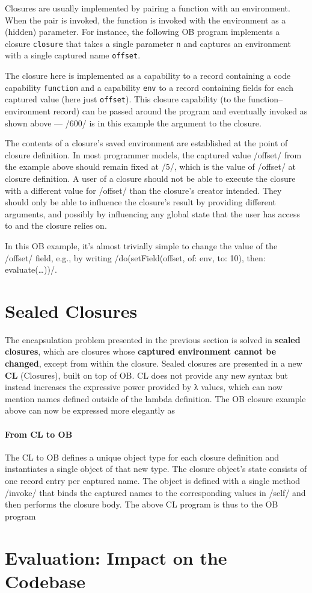 \documentclass[main.tex]{subfiles}
\begin{document}
Closures are usually implemented by pairing a function with an environment. When the pair is invoked, the function is invoked with the environment as a (hidden) parameter. For instance, the following OB program implements a closure \texttt{closure} that takes a single parameter \texttt{n} and captures an environment with a single captured name \texttt{offset}.

The closure here is implemented as a capability to a record containing a code capability \texttt{function} and a capability \texttt{env} to a record containing fields for each captured value (here just \texttt{offset}). This closure capability (to the function–environment record) can be passed around the program and eventually invoked as shown above — \iil/600/ is in this example the argument to the closure.

The contents of a closure's saved environment are established at the point of closure definition. In most programmer models, the captured value \iil/offset/ from the example above should remain fixed at \iil/5/, which is the value of \iil/offset/ at closure definition. A user of a closure should not be able to execute the closure with a different value for \iil/offset/ than the closure's creator intended. They should only be able to influence the closure's result by providing different arguments, and possibly by influencing any global state that the user has access to and the closure relies on.

In this OB example, it's almost trivially simple to change the value of the \iil/offset/ field, e.g., by writing \iil/do(setField(offset, of: env, to: 10), then: evaluate(…))/.

\section{Sealed Closures} \label{sct:cls-sealed}
The encapsulation problem presented in the previous section is solved in \textbf{sealed closures}, which are closures whose \textbf{captured environment cannot be changed}, except from within the closure. Sealed closures are presented in a new  \textbf{CL} (Closures), built on top of OB. CL does not provide any new syntax but instead increases the expressive power provided by λ values, which can now mention names defined outside of the lambda definition. The OB closure example above can now be expressed more elegantly as

\paragraph{From CL to OB} The CL to OB  defines a unique object type for each closure definition and instantiates a single object of that new type. The closure object's state consists of one record entry per captured name. The object is defined with a single method \iil/invoke/ that binds the captured names to the corresponding values in \iil/self/ and then performs the closure body. The above CL program is thus \lowered{} to the OB program

\section{Evaluation: Impact on the Codebase} \label{sct:cls-eval}

\onlyinsubfile{\glsaddall\printglossaries}
\end{document}
